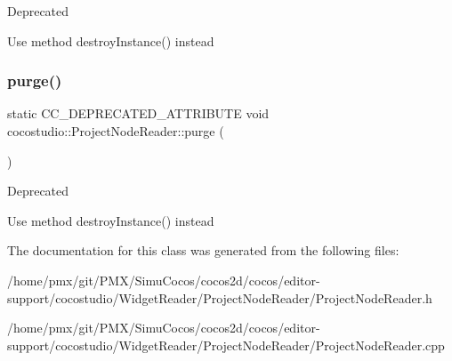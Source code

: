\begin{DoxyRefDesc}{Deprecated}
\item[\hyperlink{deprecated__deprecated000099}{Deprecated}]Use method destroy\+Instance() instead \end{DoxyRefDesc}
\mbox{\label{classcocostudio_1_1ProjectNodeReader_a34ea8d5fa45e143a79682fbd1f17ed41}} 
\subsubsection{\texorpdfstring{purge()}{purge()}\hspace{0.1cm}{\footnotesize\ttfamily [2/2]}}
{\footnotesize\ttfamily static C\+C\+\_\+\+D\+E\+P\+R\+E\+C\+A\+T\+E\+D\+\_\+\+A\+T\+T\+R\+I\+B\+U\+TE void cocostudio\+::\+Project\+Node\+Reader\+::purge (\begin{DoxyParamCaption}{ }\end{DoxyParamCaption})\hspace{0.3cm}{\ttfamily [static]}}

\begin{DoxyRefDesc}{Deprecated}
\item[\hyperlink{deprecated__deprecated000334}{Deprecated}]Use method destroy\+Instance() instead \end{DoxyRefDesc}


The documentation for this class was generated from the following files\+:\begin{DoxyCompactItemize}
\item 
/home/pmx/git/\+P\+M\+X/\+Simu\+Cocos/cocos2d/cocos/editor-\/support/cocostudio/\+Widget\+Reader/\+Project\+Node\+Reader/Project\+Node\+Reader.\+h\item 
/home/pmx/git/\+P\+M\+X/\+Simu\+Cocos/cocos2d/cocos/editor-\/support/cocostudio/\+Widget\+Reader/\+Project\+Node\+Reader/Project\+Node\+Reader.\+cpp\end{DoxyCompactItemize}
